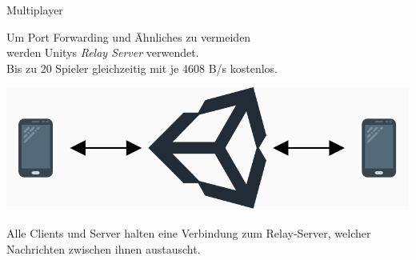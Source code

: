 \documentclass{beamer}
\begin{document}
  \begin{frame}{Multiplayer}
  	\begin{center}
  		Um Port Forwarding und Ähnliches zu vermeiden \\werden Unitys \emph{Relay Server} verwendet. \\Bis zu 20 Spieler gleichzeitig mit je 4608 B/s kostenlos.
  	\end{center}
  	\begin{center}
  		\includegraphics[width=.9\textwidth]{bilder/relay.pdf}
  	\end{center}
  	\begin{center}
  		Alle Clients und Server halten eine Verbindung zum Relay-Server, welcher Nachrichten zwischen ihnen austauscht.\\
  	\end{center}
  \end{frame}
  
  
  
%    
%    		
%    		
  
\end{document}
